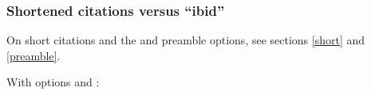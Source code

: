 \documentclass[11pt,letterpaper,oneside]{article}
\begin{document}
\setcounter{subsubsection}{33}
\subsubsection{Shortened citations versus ``ibid''}
\label{14.34}

On short citations and the  and  preamble
options, see sections \ref{short} and \ref{preamble}.

\begin{citeonly}
\item \cite[3]{morrison2004a}
\item \cite[18]{morrison2004a}
\item \cite[18]{morrison2004a}
\item \cite[24--26]{morrison2004a}
\item \cite[401-2]{morrison2004b}
\item \cite[433]{morrison2004b}
\item \cite[37--38]{diaz2007}
\item \cite[403]{morrison2004b}
\item \cite[152]{diaz2007}
\item \cite[201-2]{diaz2007}
\item \cites[240]{morrison2004b}[32]{morrison2004a}
 \item \cite[33]{morrison2004a}
\end{citeonly}

\noindent With options  and :
\end{document}
